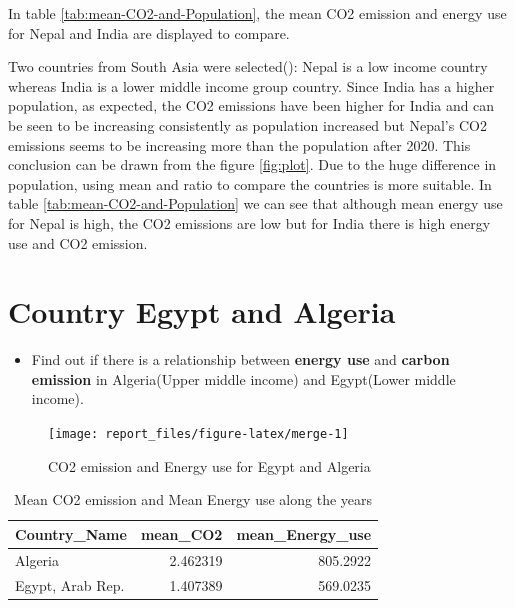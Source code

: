 \documentclass[11pt,a4paper,]{article}
\providecommand{\tightlist}{%
  \setlength{\itemsep}{0pt}\setlength{\parskip}{0pt}}
\begin{document}
In table \ref{tab:mean-CO2-and-Population}, the mean CO2 emission and energy use for Nepal and India are displayed to compare.

Two countries from South Asia were selected(\textcite{A2005rev}): Nepal is a low income country whereas India is a lower middle income group country. Since India has a higher population, as expected, the CO2 emissions have been higher for India and can be seen to be increasing consistently as population increased but Nepal's CO2 emissions seems to be increasing more than the population after 2020. This conclusion can be drawn from the figure \ref{fig:plot}. Due to the huge difference in population, using mean and ratio to compare the countries is more suitable. In table \ref{tab:mean-CO2-and-Population} we can see that although mean energy use for Nepal is high, the CO2 emissions are low but for India there is high energy use and CO2 emission.

\section*{Country Egypt and Algeria}

\begin{itemize}
\tightlist
\item
  Find out if there is a relationship between \textbf{energy use} and \textbf{carbon emission} in Algeria(Upper middle income) and Egypt(Lower middle income).
\end{itemize}

\begin{figure}

{\centering \texttt{[image: report\_files/figure-latex/merge-1]} 

}

\caption{CO2 emission and Energy use for Egypt and Algeria}\label{fig:merge}
\end{figure}

\newpage

\begin{table}

\caption{\label{tab:Mean}Mean CO2 emission and Mean Energy use along the years}
\centering
\begin{tabular}[t]{l|r|r}
\hline
Country\_Name & mean\_CO2 & mean\_Energy\_use\\
\hline
Algeria & 2.462319 & 805.2922\\
\hline
Egypt, Arab Rep. & 1.407389 & 569.0235\\
\hline
\end{tabular}
\end{table}
\end{document}
